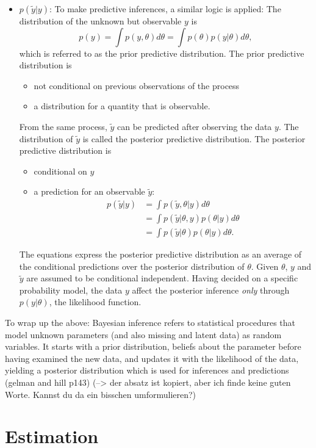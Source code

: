 \documentclass[a4, 12pt]{article}
\begin{document}
\begin{itemize}
\item $p(\tilde y|y)$:
To make predictive inferences, a similar logic is applied:
The distribution of the unknown but observable $y$ is
$$p(y)=\int p(y,\theta)d\theta=\int p(\theta)p(y|\theta)d\theta,$$ which is referred to as the prior predictive distribution. The prior predictive distribution is
\begin{itemize}
\item not conditional on previous observations of the process
\item a distribution for a quantity that is observable.
\end{itemize}
From the same process, $\tilde{y}$ can be predicted after observing the data $y$.
The distribution of $\tilde{y}$ is called the posterior predictive distribution. The posterior predictive distribution is
\begin{itemize}
\item conditional on $y$
\item a prediction for an observable $\tilde y:$
\begin{align*}
p(\tilde{y}|y) & =\int p(\tilde{y},\theta|y)d\theta \\
& = \int p(\tilde{y}|\theta,y)p(\theta|y)d\theta \\
& = \int p(\tilde{y}|\theta)p(\theta|y)d\theta.
\end{align*}
\end{itemize}
The equations express the posterior predictive distribution as an average of the conditional predictions over the posterior distribution of $\theta$. Given $\theta$, $y$ and $\tilde{y}$ are assumed to be conditional independent.
Having decided on a specific probability model, the data $y$ affect the posterior inference \emph{only} through $p(y|\theta)$, the likelihood function.
\end{itemize}

To wrap up the above: Bayesian inference refers to statistical procedures that model unknown parameters (and also missing and latent data) as random variables. It starts with a prior distribution, beliefs about the parameter before having examined the new data, and updates it with the likelihood of the data, yielding a posterior distribution which is used for inferences and predictions (gelman and hill p143) (--\textgreater{} der absatz ist kopiert, aber ich finde keine guten Worte. Kannst du da ein bisschen umformulieren?)

\hypertarget{estimation}{%
\section{Estimation}\label{estimation}}
\end{document}
